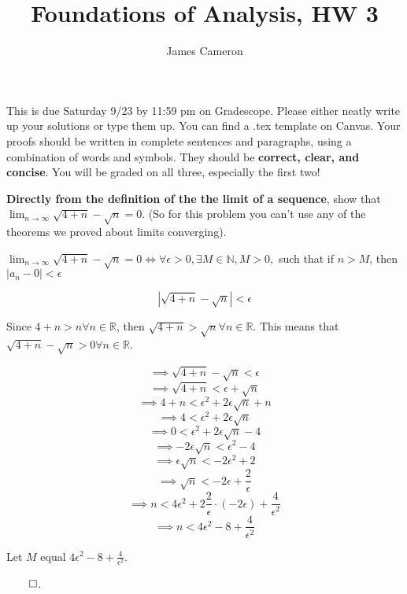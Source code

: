 \documentclass[answers]{exam}
\title{Foundations of Analysis, HW 3}
\author{James Cameron}
\date{}
\theoremstyle{remark}
\theoremstyle{definition}
\newcommand{\NN}{\mathbb{N}}
\newcommand{\RR}{\mathbb{R}}
\begin{document}



 This is due Saturday 9/23 by 11:59 pm on Gradescope. Please either neatly write up your solutions or type them up. You can find a .tex template on Canvas. Your proofs should be written in complete sentences and paragraphs, using a combination of words and symbols. They should be \textbf{correct, clear, and concise}. You will be graded on all three, especially the first two!

\noindent


\begin{questions}

\question \textbf{Directly from the definition of the the limit of a sequence}, show that $\lim_{n \to \infty} \sqrt{4+n}-\sqrt{n}=0$. (So for this problem you can't use any of the theorems we proved about limits converging).

\begin{solution}


$\lim_{n \to \infty} \sqrt{4+n}-\sqrt{n}=0 \iff \forall \epsilon > 0, \exists M \in \NN, M > 0,$ such that if $n > M$, then $|a_n - 0| < \epsilon$

\[|\sqrt{4+n}-\sqrt{n}| < \epsilon\]

Since $4+n > n \forall n \in \RR$, then $\sqrt{4+n} > \sqrt{n} \forall n \in \RR$.
This means that $\sqrt{4+n} - \sqrt{n} > 0 \forall n \in \RR$.

\[\implies \sqrt{4+n}-\sqrt{n} < \epsilon\]
\[\implies \sqrt{4+n} < \epsilon + \sqrt{n}\]
\[\implies 4+n < \epsilon^2 + 2 \epsilon \sqrt{n} + n\]
\[\implies 4 < \epsilon^2 + 2 \epsilon \sqrt{n}\]
\[\implies 0 < \epsilon^2 + 2 \epsilon \sqrt{n} - 4\]
\[\implies -2 \epsilon \sqrt{n} < \epsilon^2 - 4\]
\[\implies \epsilon \sqrt{n} < -2 \epsilon^2 + 2\]
\[\implies \sqrt{n} < -2 \epsilon + \frac{2}{\epsilon}\]
\[\implies n < 4 \epsilon^2 + 2 \frac{2}{\epsilon} \cdot (-2 \epsilon) + \frac{4}{\epsilon^2}\]
\[\implies n < 4 \epsilon^2 - 8 + \frac{4}{\epsilon^2}\]

Let $M$ equal $4 \epsilon^2 - 8 + \frac{4}{\epsilon^2}$.

$\qed$.



\end{solution}



\end{questions}
\end{document}
